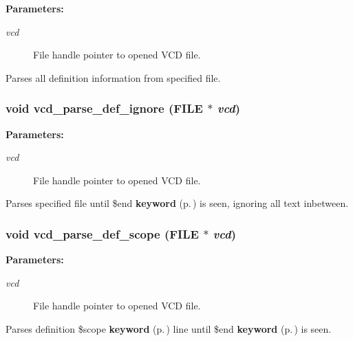 \begin{Desc}
\item[{\bf Parameters: }]\par
\begin{description}
\item[
{\em vcd}]File handle pointer to opened VCD file.

\end{description}
\end{Desc}
Parses all definition information from specified file. 
\subsubsection{\setlength{\rightskip}{0pt plus 5cm}void vcd\_\-parse\_\-def\_\-ignore (FILE $\ast$ {\em vcd})}\label{vcd_8c_a4}


\begin{Desc}
\item[{\bf Parameters: }]\par
\begin{description}
\item[
{\em vcd}]File handle pointer to opened VCD file.

\end{description}
\end{Desc}
Parses specified file until \$end {\bf keyword} {\rm (p.\,\pageref{structkeyword})} is seen, ignoring all text inbetween. 
\subsubsection{\setlength{\rightskip}{0pt plus 5cm}void vcd\_\-parse\_\-def\_\-scope (FILE $\ast$ {\em vcd})}\label{vcd_8c_a6}


\begin{Desc}
\item[{\bf Parameters: }]\par
\begin{description}
\item[
{\em vcd}]File handle pointer to opened VCD file.

\end{description}
\end{Desc}
Parses definition \$scope {\bf keyword} {\rm (p.\,\pageref{structkeyword})} line until \$end {\bf keyword} {\rm (p.\,\pageref{structkeyword})} is seen. 

